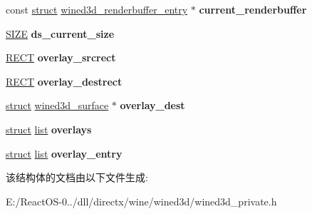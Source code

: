 \begin{DoxyCompactItemize}
const \hyperlink{interfacestruct}{struct} \hyperlink{structwined3d__renderbuffer__entry}{wined3d\+\_\+renderbuffer\+\_\+entry} $\ast$ {\bfseries current\+\_\+renderbuffer}
\item 
\mbox{\label{structwined3d__surface_a01b6df2d78104844cc14cfafa858866f}} 
\hyperlink{structtag_s_i_z_e}{S\+I\+ZE} {\bfseries ds\+\_\+current\+\_\+size}
\item 
\mbox{\label{structwined3d__surface_a4f3622a4a5d12acabeb46fae32e69398}} 
\hyperlink{structtag_r_e_c_t}{R\+E\+CT} {\bfseries overlay\+\_\+srcrect}
\item 
\mbox{\label{structwined3d__surface_a33cb7324ba1c90c69ca316df9f9cc3fe}} 
\hyperlink{structtag_r_e_c_t}{R\+E\+CT} {\bfseries overlay\+\_\+destrect}
\item 
\mbox{\label{structwined3d__surface_aa6140ed70bfc888df1052a683e96f81c}} 
\hyperlink{interfacestruct}{struct} \hyperlink{structwined3d__surface}{wined3d\+\_\+surface} $\ast$ {\bfseries overlay\+\_\+dest}
\item 
\mbox{\label{structwined3d__surface_acacc449bae575e7d3fd9a651ae7a8305}} 
\hyperlink{interfacestruct}{struct} \hyperlink{classlist}{list} {\bfseries overlays}
\item 
\mbox{\label{structwined3d__surface_a2a068391367dfa1aeaee24550805eee5}} 
\hyperlink{interfacestruct}{struct} \hyperlink{classlist}{list} {\bfseries overlay\+\_\+entry}
\end{DoxyCompactItemize}


该结构体的文档由以下文件生成\+:\begin{DoxyCompactItemize}
\item 
E\+:/\+React\+O\+S-\/0../dll/directx/wine/wined3d/wined3d\+\_\+private.\+h\end{DoxyCompactItemize}
